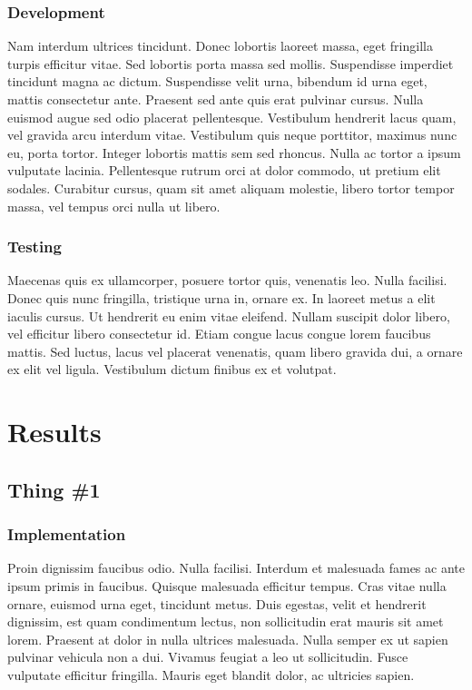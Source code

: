 \subsection{Development}
Nam interdum ultrices tincidunt. Donec lobortis laoreet massa, eget fringilla turpis efficitur vitae. Sed lobortis porta massa sed mollis. Suspendisse imperdiet tincidunt magna ac dictum. Suspendisse velit urna, bibendum id urna eget, mattis consectetur ante. Praesent sed ante quis erat pulvinar cursus. Nulla euismod augue sed odio placerat pellentesque. Vestibulum hendrerit lacus quam, vel gravida arcu interdum vitae. Vestibulum quis neque porttitor, maximus nunc eu, porta tortor. Integer lobortis mattis sem sed rhoncus. Nulla ac tortor a ipsum vulputate lacinia. Pellentesque rutrum orci at dolor commodo, ut pretium elit sodales. Curabitur cursus, quam sit amet aliquam molestie, libero tortor tempor massa, vel tempus orci nulla ut libero.

\subsection{Testing}
Maecenas quis ex ullamcorper, posuere tortor quis, venenatis leo. Nulla facilisi. Donec quis nunc fringilla, tristique urna in, ornare ex. In laoreet metus a elit iaculis cursus. Ut hendrerit eu enim vitae eleifend. Nullam suscipit dolor libero, vel efficitur libero consectetur id. Etiam congue lacus congue lorem faucibus mattis. Sed luctus, lacus vel placerat venenatis, quam libero gravida dui, a ornare ex elit vel ligula. Vestibulum dictum finibus ex et volutpat.


\chapter{Results}

\section{Thing \#1}

\subsection{Implementation}
Proin dignissim faucibus odio. Nulla facilisi. Interdum et malesuada fames ac ante ipsum primis in faucibus. Quisque malesuada efficitur tempus. Cras vitae nulla ornare, euismod urna eget, tincidunt metus. Duis egestas, velit et hendrerit dignissim, est quam condimentum lectus, non sollicitudin erat mauris sit amet lorem. Praesent at dolor in nulla ultrices malesuada. Nulla semper ex ut sapien pulvinar vehicula non a dui. Vivamus feugiat a leo ut sollicitudin. Fusce vulputate efficitur fringilla. Mauris eget blandit dolor, ac ultricies sapien.


